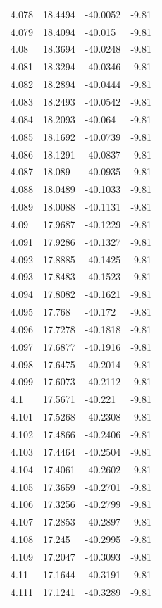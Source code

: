 \begin{tabular}{llll}
4.078 & 18.4494 & -40.0052 & -9.81 \\
4.079 & 18.4094 & -40.015 & -9.81 \\
4.08 & 18.3694 & -40.0248 & -9.81 \\
4.081 & 18.3294 & -40.0346 & -9.81 \\
4.082 & 18.2894 & -40.0444 & -9.81 \\
4.083 & 18.2493 & -40.0542 & -9.81 \\
4.084 & 18.2093 & -40.064 & -9.81 \\
4.085 & 18.1692 & -40.0739 & -9.81 \\
4.086 & 18.1291 & -40.0837 & -9.81 \\
4.087 & 18.089 & -40.0935 & -9.81 \\
4.088 & 18.0489 & -40.1033 & -9.81 \\
4.089 & 18.0088 & -40.1131 & -9.81 \\
4.09 & 17.9687 & -40.1229 & -9.81 \\
4.091 & 17.9286 & -40.1327 & -9.81 \\
4.092 & 17.8885 & -40.1425 & -9.81 \\
4.093 & 17.8483 & -40.1523 & -9.81 \\
4.094 & 17.8082 & -40.1621 & -9.81 \\
4.095 & 17.768 & -40.172 & -9.81 \\
4.096 & 17.7278 & -40.1818 & -9.81 \\
4.097 & 17.6877 & -40.1916 & -9.81 \\
4.098 & 17.6475 & -40.2014 & -9.81 \\
4.099 & 17.6073 & -40.2112 & -9.81 \\
4.1 & 17.5671 & -40.221 & -9.81 \\
4.101 & 17.5268 & -40.2308 & -9.81 \\
4.102 & 17.4866 & -40.2406 & -9.81 \\
4.103 & 17.4464 & -40.2504 & -9.81 \\
4.104 & 17.4061 & -40.2602 & -9.81 \\
4.105 & 17.3659 & -40.2701 & -9.81 \\
4.106 & 17.3256 & -40.2799 & -9.81 \\
4.107 & 17.2853 & -40.2897 & -9.81 \\
4.108 & 17.245 & -40.2995 & -9.81 \\
4.109 & 17.2047 & -40.3093 & -9.81 \\
4.11 & 17.1644 & -40.3191 & -9.81 \\
4.111 & 17.1241 & -40.3289 & -9.81 \\

\end{tabular}
